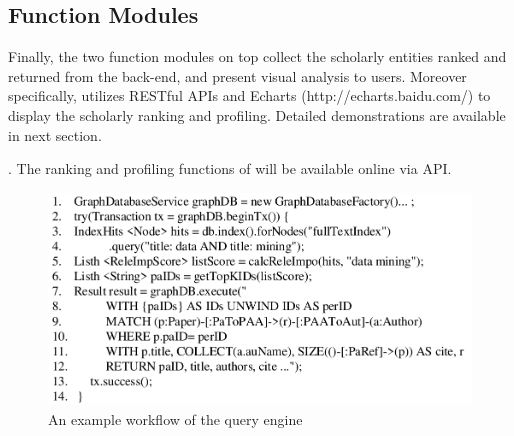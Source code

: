 \subsection{Function Modules}
Finally, the two function modules on top collect the scholarly entities ranked and returned from the back-end, and present visual analysis to users. Moreover specifically, \oursystem utilizes RESTful APIs  and Echarts {\scriptsize (http://echarts.baidu.com/)} to display the scholarly ranking and profiling. Detailed demonstrations are available in next section.

. The ranking and profiling functions of \oursystem will be available online via API.

\begin{figure}
\centering
\includegraphics[width=\columnwidth]{queryProcess.pdf}
\vspace{-3ex}
\caption{An example workflow of the query engine}
\label{fig:queryProcess}
\end{figure}





